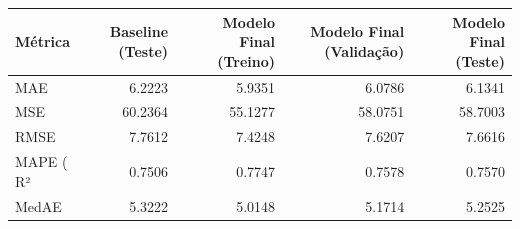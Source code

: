 \begin{tabular}{lrrrr}
\toprule
Métrica & Baseline (Teste) & Modelo Final (Treino) & Modelo Final (Validação) & Modelo Final (Teste) \\
\midrule
MAE & 6.2223 & 5.9351 & 6.0786 & 6.1341 \\
MSE & 60.2364 & 55.1277 & 58.0751 & 58.7003 \\
RMSE & 7.7612 & 7.4248 & 7.6207 & 7.6616 \\
MAPE (%
R² & 0.7506 & 0.7747 & 0.7578 & 0.7570 \\
MedAE & 5.3222 & 5.0148 & 5.1714 & 5.2525 \\
\bottomrule
\end{tabular}

